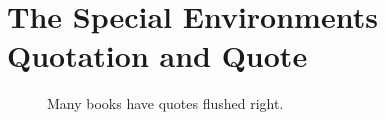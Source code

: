 \chapter{The Special Environments Quotation and Quote}

\label{quotations}


\begin{figure}[p]
\centering
{}
\caption{Many books have quotes flushed right.}
\label{frightquotation}
\end{figure}

